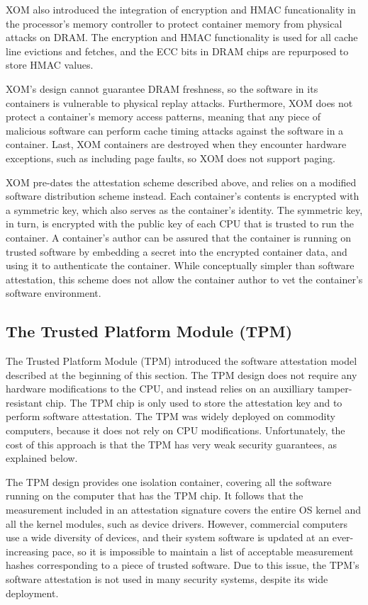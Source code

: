 XOM also introduced the integration of encryption and HMAC funcationality in
the processor's memory controller to protect container memory from physical
attacks on DRAM. The encryption and HMAC functionality is used for all cache
line evictions and fetches, and the ECC bits in DRAM chips are repurposed to
store HMAC values.

XOM's design cannot guarantee DRAM freshness, so the software in its containers
is vulnerable to physical replay attacks. Furthermore, XOM does not protect a
container's memory access patterns, meaning that any piece of malicious
software can perform cache timing attacks against the software in a container.
Last, XOM containers are destroyed when they encounter hardware exceptions,
such as including page faults, so XOM does not support paging.

XOM pre-dates the attestation scheme described above, and relies on a modified
software distribution scheme instead. Each container's contents is encrypted
with a symmetric key, which also serves as the container's identity. The
symmetric key, in turn, is encrypted with the public key of each CPU that is
trusted to run the container. A container's author can be assured that the
container is running on trusted software by embedding a secret into the
encrypted container data, and using it to authenticate the container. While
conceptually simpler than software attestation, this scheme does not allow the
container author to vet the container's software environment.


\subsection{The Trusted Platform Module (TPM)}

The Trusted Platform Module (TPM) \cite{grawrock2003tpm} introduced the
software attestation model described at the beginning of this section. The TPM
design does not require any hardware modifications to the CPU, and instead
relies on an auxilliary tamper-resistant chip. The TPM chip is only used to
store the attestation key and to perform software attestation. The TPM was
widely deployed on commodity computers, because it does not rely on CPU
modifications. Unfortunately, the cost of this approach is that the TPM has
very weak security guarantees, as explained below.

The TPM design provides one isolation container, covering all the software
running on the computer that has the TPM chip. It follows that the measurement
included in an attestation signature covers the entire OS kernel and all the
kernel modules, such as device drivers. However, commercial computers use a
wide diversity of devices, and their system software is updated at an
ever-increasing pace, so it is impossible to maintain a list of acceptable
measurement hashes corresponding to a piece of trusted software. Due to this
issue, the TPM's software attestation is not used in many security systems,
despite its wide deployment.

